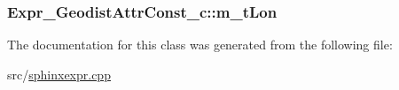 \hypertarget{classExpr__GeodistAttrConst__c_a924911c06b12c6473665435bfa96e101}{
\subsubsection[{m\-\_\-t\-Lon}]{ Expr\-\_\-\-Geodist\-Attr\-Const\-\_\-c\-::m\-\_\-t\-Lon\hspace{0.3cm}{\ttfamily [private]}}}\label{classExpr__GeodistAttrConst__c_a924911c06b12c6473665435bfa96e101}


The documentation for this class was generated from the following file\-:\begin{DoxyCompactItemize}
\item 
src/\hyperlink{sphinxexpr_8cpp}{sphinxexpr.\-cpp}\end{DoxyCompactItemize}
